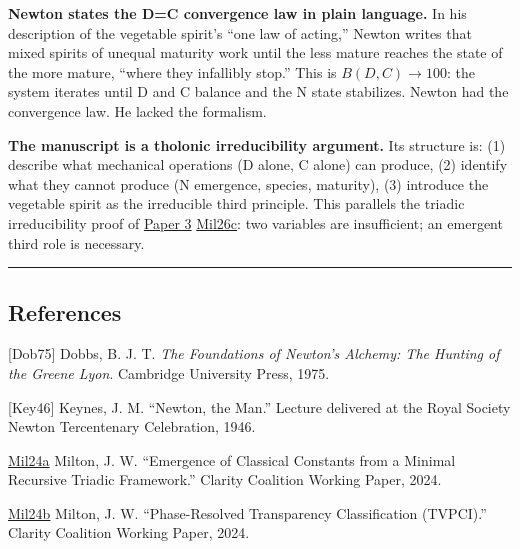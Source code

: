 \documentclass[
  11pt,
  letterpaper,
]{article}
\begin{document}
\textbf{Newton states the D=C convergence law in plain language.} In his
description of the vegetable spirit's ``one law of acting,'' Newton
writes that mixed spirits of unequal maturity work until the less mature
reaches the state of the more mature, ``where they infallibly stop.''
This is \(B(D,C) \to 100\): the system iterates until D and C balance
and the N state stabilizes. Newton had the convergence law. He lacked
the formalism.

\textbf{The manuscript is a tholonic irreducibility argument.} Its
structure is: (1) describe what mechanical operations (D alone, C alone)
can produce, (2) identify what they cannot produce (N emergence,
species, maturity), (3) introduce the vegetable spirit as the
irreducible third principle. This parallels the triadic irreducibility
proof of
\href{https://github.com/baardev/truevalue/blob/main/docnav/Research/papers/3_minimal-recursive-triadic-framework/3_minimal-recursive-triadic-framework.pdf}{Paper
3}
\href{https://github.com/baardev/truevalue/blob/main/docnav/Research/papers/3_minimal-recursive-triadic-framework/3_minimal-recursive-triadic-framework.pdf}{Mil26c}:
two variables are insufficient; an emergent third role is necessary.

\begin{center}\rule{0.5\linewidth}{0.5pt}\end{center}

\subsection{References}\label{references}

{[}Dob75{]} Dobbs, B. J. T. \emph{The Foundations of Newton's Alchemy:
The Hunting of the Greene Lyon}. Cambridge University Press, 1975.

{[}Key46{]} Keynes, J. M. ``Newton, the Man.'' Lecture delivered at the
Royal Society Newton Tercentenary Celebration, 1946.

\href{https://github.com/baardev/truevalue/blob/main/docnav/Research/papers/1_recursive-tholonic-five-constants/1_recursive-tholonic-five-constants.pdf}{Mil24a}
Milton, J. W. ``Emergence of Classical Constants from a Minimal
Recursive Triadic Framework.'' Clarity Coalition Working Paper, 2024.

\href{https://github.com/baardev/truevalue/blob/main/docnav/Research/papers/2_supply-chain-transparency-tvpci/2_supply-chain-transparency-tvpci.pdf}{Mil24b}
Milton, J. W. ``Phase-Resolved Transparency Classification (TVPCI).''
Clarity Coalition Working Paper, 2024.
\end{document}
